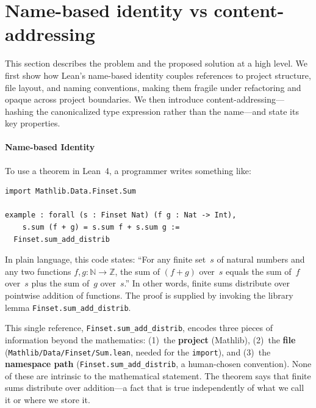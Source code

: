 
\section{Name-based identity vs content-addressing}

This section describes the problem and the proposed solution at a
  high level.  We first show how Lean's name-based identity couples
  references to project structure, file layout, and naming conventions,
  making them fragile under refactoring and opaque across project
  boundaries.  We then introduce content-addressing---hashing the
  canonicalized type expression rather than the name---and state its
  key properties.

\paragraph{Name-based Identity}

To use a theorem in Lean~4, a programmer writes something like:

\begin{lstlisting}[caption={Using a theorem by its fully qualified name}]
import Mathlib.Data.Finset.Sum

example : forall (s : Finset Nat) (f g : Nat -> Int),
    s.sum (f + g) = s.sum f + s.sum g :=
  Finset.sum_add_distrib
\end{lstlisting}

\noindent
{}

In plain language, this code states: ``For any finite set~$s$ of natural numbers and any two functions $f, g \colon \mathbb{N} \to \mathbb{Z}$, the sum of $(f+g)$ over~$s$ equals the sum of~$f$ over~$s$ plus the sum of~$g$ over~$s$.''  In other words, finite sums distribute over pointwise addition of functions.  The proof is supplied by invoking the library lemma \texttt{Finset.sum\_add\_distrib}.

This single reference, \texttt{Finset.sum\_add\_distrib}, encodes three
pieces of information beyond the mathematics: (1)~the \textbf{project}
(Mathlib), (2)~the \textbf{file}
(\texttt{Mathlib/Data/Finset/Sum.lean}, needed for the \texttt{import}),
and (3)~the \textbf{namespace path}
(\texttt{Finset.sum\_add\_distrib}, a human-chosen convention).
None of these are intrinsic to the mathematical statement.  The theorem
says that finite sums distribute over addition---a fact that is true
independently of what we call it or where we store it.

